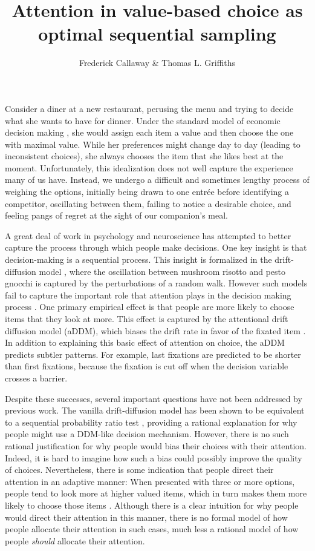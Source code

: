 \documentclass[12pt,a4paperpaper,]{article}
\title{\vspace{-2em}Attention in value-based choice as optimal sequential sampling}
\author{Frederick Callaway \& Thomas L. Griffiths}
\date{\vspace{-1em}}
\begin{document}
\maketitle




Consider a diner at a new restaurant, perusing the menu and trying to decide what she wants to have for dinner. Under the standard model of economic decision making \citep{Kahneman1979,Rangel2008}, she would assign each item a value and then choose the one with maximal value. While her preferences might change day to day (leading to inconsistent choices), she always chooses the item that she likes best at the moment. Unfortunately, this idealization does not well capture the experience many of us have. Instead, we undergo a difficult and sometimes lengthy process of weighing the options, initially being drawn to one entr\'ee before identifying a competitor, oscillating between them, failing to notice a desirable choice, and feeling pangs of regret at the sight of our companion's meal.

A great deal of work in psychology and neuroscience has attempted to better capture the process through which people make decisions. One key insight is that decision-making is a sequential process. This insight is formalized in the drift-diffusion model \citep{Ratcliff1978,Milosavljevic2010}, where the oscillation between mushroom risotto and pesto gnocchi is captured by the perturbations of a random walk. However such models fail to capture the important role that attention plays in the decision making process \citep{Orquin2013}. One primary empirical effect is that people are more likely to choose items that they look at more. This effect is captured by the attentional drift diffusion model (aDDM), which biases the drift rate in favor of the fixated item \citep{Krajbich2010}. In addition to explaining this basic effect of attention on choice, the aDDM predicts subtler patterns. For example, last fixations are predicted to be shorter than first fixations, because the fixation is cut off when the decision variable crosses a barrier.


Despite these successes, several important questions have not been addressed by previous work. The vanilla drift-diffusion model has been shown to be equivalent to a sequential probability ratio test \citep{Bogacz2006,Bitzer2014}, providing a rational explanation for why people might use a DDM-like decision mechanism. However, there is no such rational justification for why people would bias their choices with their attention. Indeed, it is hard to imagine how such a bias could possibly improve the quality of choices. Nevertheless, there is some indication that people direct their attention in an adaptive manner: When presented with three or more options, people tend to look more at higher valued items, which in turn makes them more likely to choose those items  \citep{Krajbich2011}. Although there is a clear intuition for why people would direct their attention in this manner, there is no formal model of how people allocate their attention in such cases, much less a rational model of how people \emph{should} allocate their attention.
\end{document}
